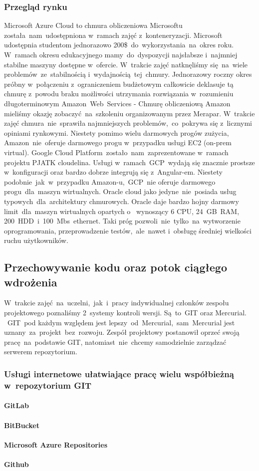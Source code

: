 \subsubsection{Przegląd rynku}
\indent Microsoft Azure Cloud to chmura obliczeniowa Microsoftu została~nam~udostępniona w~ramach zajęć z~konteneryzacji.
Microsoft udostępnia studentom jednorazowo 200\$~do~wykorzystania~na~okres roku.
W~ramach okresu edukacyjnego mamy~do~dyspozycji najsłabsze i~najmniej stabilne maszyny dostępne w~ofercie.
W~trakcie zajęć natknęliśmy się~na~wiele problemów~ze~stabilnością i~wydajnością~tej~chmury.
Jednorazowy roczny okres próbny w~połączeniu z~ograniczeniem budżetowym całkowicie deklasuje tą chmurę z~powodu braku możliwości utrzymania rozwiązania w~rozumieniu długoterminowym
\indent Amazon~Web~Services - Chmurę obliczeniową Amazon mieliśmy okazję zobaczyć~na~szkoleniu organizowanym przez Merapar.
W~trakcie zajęć chmura~nie~sprawiła najmniejszych problemów,~co~pokrywa się z~licznymi opiniami rynkowymi.
Niestety pomimo wielu darmowych progów zużycia, Amazon~nie~oferuje darmowego progu w~przypadku usługi EC2 (\gls{on-prem} virtual).
\indent Google Cloud Platform~zostało~nam~zaprezentowane w~ramach projektu PJATK cloudelina.
Usługi w~ramach~GCP~wydają się znacznie prostsze w~konfiguracji oraz bardzo dobrze integrują się z~Angular-em.
Niestety podobnie~jak~w~przypadku Amazon-u,~GCP~nie oferuje darmowego progu~dla~maszyn wirtualnych.
\indent Oracle cloud jako jedyne~nie~posiada usług typowych~dla~architektury chmurowych.
Oracle daje bardzo hojny darmowy limit~dla~maszyn wirtualnych opartych o~ wynoszący 6 CPU, 24~GB~RAM, 200~HDD~i~100~Mbs~ethernet.
Taki próg pozwoli~nie~tylko~na~wytworzenie oprogramowania, przeprowadzenie testów,~ale~nawet i~obsługę średniej wielkości ruchu użytkowników.

\subsection{Przechowywanie kodu oraz potok ciągłego wdrożenia}
\label{subsec:przechowywanie-kodu-oraz-potok-ciagego-wdrozenia}

\indent W~trakcie zajęć~na~uczelni,~jak~i~pracy indywidualnej członków zespołu projektowego poznaliśmy 2~systemy kontroli wersji.
Są~to~GIT oraz Mercurial.
~GIT~pod każdym względem jest lepszy~od~Mercurial,~sam~Mercurial jest uznany~za~projekt~bez~rozwoju.
Zespół projektowy postanowił oprzeć swoją pracę~na~podstawie GIT, natomiast~nie~chcemy samodzielnie zarządzać serwerem repozytorium.

\subsubsection{Usługi internetowe ułatwiające pracę wielu współbieżną w~repozytorium GIT}
\paragraph{GitLab}
\paragraph{BitBucket}
\paragraph{Microsoft Azure Repositories}
\paragraph{Github}
